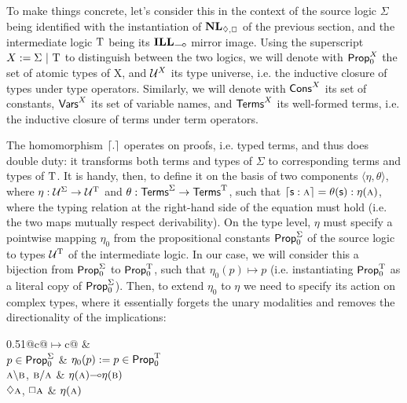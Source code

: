 To make things concrete, let's consider this in the context of the source logic $\Sigma$ being identified with the instantiation of $\NL_{\diamond,\Box}$ of the previous section, and the intermediate logic $\mathrm{T}$ being its $\ILL_{\li}$ mirror image.
Using the superscript $X := \Sigma \ | \ \mathrm{T}$ to distinguish between the two logics,
we will denote with $\mathsf{Prop}_0^X$ the set of atomic types of X, and $\mathcal{U}^X$ its type universe, i.e. the inductive closure of types under type operators.
Similarly, we will denote with $\mathsf{Cons}^{X}$ its set of constants, $\mathsf{Vars}^{X}$ its set of variable names, and $\mathsf{Terms}^{X}$ its well-formed terms, i.e. the inductive closure of terms under term operators.

The homomorphism $\lceil{.}\rceil$ operates on proofs, i.e. typed terms, and thus does double duty: it transforms both terms and types of $\Sigma$ to corresponding terms and types of $\mathrm{T}$.
It is handy, then, to define it on the basis of two components $\langle \eta, \theta \rangle$, where $\eta : \mathcal{U}^{\Sigma} \to \mathcal{U}^{\mathrm{T}}$ and $\theta: \mathsf{Terms}^{\Sigma} \to \mathsf{Terms}^{\mathrm{T}}$, such that $\hm{\smallterm{s}: \smallprop{A}} = \theta({\smallterm{s}}) : \eta({\smallprop{A}})$, where the typing relation at the right-hand side of the equation must hold (i.e. the two maps mutually respect derivability).
On the type level, $\eta$ must specify a pointwise mapping $\eta_0$ from the propositional constants $\mathsf{Prop}_0^{\Sigma}$ of the source logic to types $\mathcal{U}^{\mathrm{T}}$ of the intermediate logic.
In our case, we will consider this a bijection from $\mathsf{Prop}_0^{\Sigma}$ to $\mathsf{Prop}_0^{\mathrm{T}}$, such that $\eta_0(p) \mapsto p$ (i.e. instantiating $\mathsf{Prop}_0^{\mathrm{T}}$ as a literal copy of $\mathsf{Prop}_0^{\Sigma}$).
Then, to extend $\eta_0$ to $\eta$ we need to specify its action on complex types, where it essentially forgets the unary modalities and removes the directionality of the implications:
\begin{table}[ht]
	\centering
	\begin{tabularx}{0.51\textwidth}{@{}c@{\quad$\mapsto$\quad}c@{}}
		 & \\
		\toprule
		$p \in \mathsf{Prop}_0^{\Sigma}$							& $\eta_0(p) := p \in \mathsf{Prop}_0^{\mathrm{T}}$\\
		$\smallprop{A}\divleft\smallprop{B}$,		
		$\smallprop{B}\divright\smallprop{A}$				& $\eta(\smallprop{A})\li\eta(\smallprop{B})$\\
		$\diamond\smallprop{A}$, 	$\Box\smallprop{A}$		& $\eta(\smallprop{A})$
	\end{tabularx}
	\caption{Inductive definition of $\eta$.}
	\label{todo}
\end{table}

